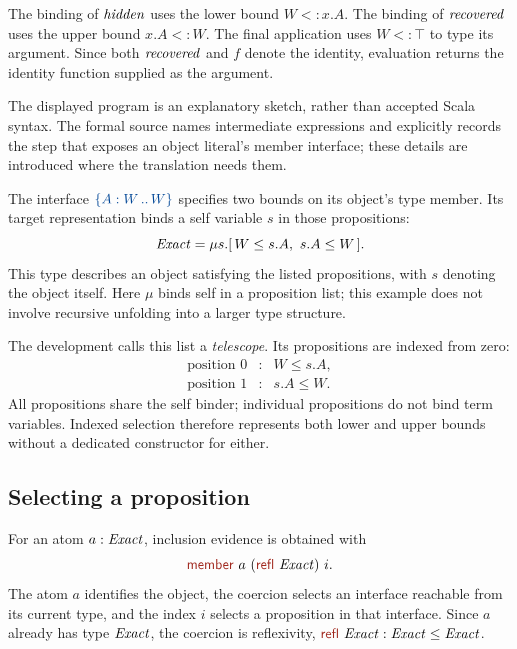 


The binding of $\mathit{hidden}$ uses the lower bound $W<:x.A$.
The binding of $\mathit{recovered}$ uses the upper bound $x.A<:W$.
The final application uses $W<:\top$ to type its argument. Since both
$\mathit{recovered}$ and $f$ denote the identity, evaluation returns the
identity function supplied as the argument.

The displayed program is an explanatory sketch, rather than accepted
Scala syntax. The formal source names intermediate expressions and
explicitly records the step that exposes an object literal's member
interface; these details are introduced where the translation needs them.





\label{sec:telescopes}

The interface $\iface{W}{W}$ specifies two bounds on its object's type
member. Its target representation binds a self variable $s$ in those
propositions:
\[
 \mathit{Exact}=\mu s.[\,W\le s.A,\ s.A\le W\,].
\]
This type describes an object satisfying the listed propositions, with
$s$ denoting the object itself. Here $\mu$ binds self in a proposition
list; this example does not involve recursive unfolding into a larger
type structure.

The development calls this list a \emph{telescope}. Its propositions are
indexed from zero:
\[
 \begin{array}{ccl}
 \text{position }0&:&W\le s.A,\\
 \text{position }1&:&s.A\le W.
 \end{array}
\]
All propositions share the self binder; individual propositions do not
bind term variables. Indexed selection therefore represents both lower
and upper bounds without a dedicated constructor for either.

\subsection*{Selecting a proposition}
For an atom $a:\mathit{Exact}$, inclusion evidence is obtained with
\[
 \ev{member}\ a\ (\ev{refl}\ \ty{Exact})\ i.
\]
The atom $a$ identifies the object, the coercion selects an interface
reachable from its current type, and the index $i$ selects a proposition
in that interface. Since $a$ already has type $\mathit{Exact}$, the coercion
is reflexivity, $\ev{refl}\ \ty{Exact}:\ty{Exact}\le\ty{Exact}$.

